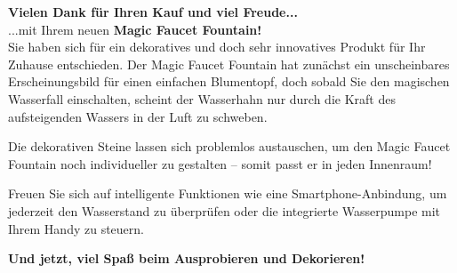\newpage
\vspace*{\fill} %
\begin{center}
	\begin{tcolorbox}[colback=white!95!gray,
		colframe=black,
		width=0.9\textwidth,
		boxrule=0.5mm,
		arc=2mm,
		auto outer arc,
		drop shadow]
		\textbf{Vielen Dank für Ihren Kauf und viel Freude...} \\
		...mit Ihrem neuen \textbf{Magic Faucet Fountain!}\\
		
		Sie haben sich für ein dekoratives und doch sehr innovatives Produkt für Ihr Zuhause entschieden. Der Magic Faucet Fountain hat zunächst ein unscheinbares Erscheinungsbild für einen einfachen Blumentopf, doch sobald Sie den magischen Wasserfall einschalten, scheint der Wasserhahn nur durch die Kraft des aufsteigenden Wassers in der Luft zu schweben.
		
		Die dekorativen Steine lassen sich problemlos austauschen, um den Magic Faucet Fountain noch individueller zu gestalten – somit passt er in jeden Innenraum!
		
		Freuen Sie sich auf intelligente Funktionen wie eine Smartphone-Anbindung, um jederzeit den Wasserstand zu überprüfen oder die integrierte Wasserpumpe mit Ihrem Handy zu steuern.
		
		\medskip
		\centering
		\textbf{Und jetzt, viel Spaß beim Ausprobieren und Dekorieren!}
	\end{tcolorbox}
\end{center}
\vspace*{\fill} %
